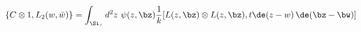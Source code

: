 \begin{equation}
\{ C\otimes 1 , L_2(w,\bar{w})\}=\int_{\Si_{\tau}} d^2z~ \psi(z,\bz)
\frac1k[L(z,\bz)\otimes L(z,\bz), t\de(z-w)\,\de(\bz-\bw)]
\label{calcu}
\end{equation}

